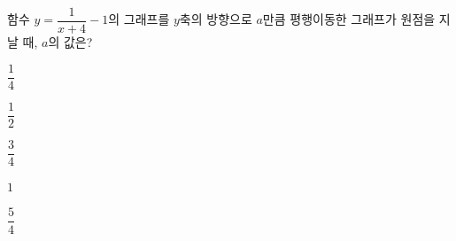 \hspace*{2mm}\begin{minipage}[t]{\dimexpr\linewidth-2mm\relax}\vspace{0pt}
함수 $y=\dfrac{1}{x+4}-1$의 그래프를 $y$축의 방향으로 $a$만큼 평행이동한 그래프가 원점을 지날 때, $a$의 값은?
\begin{choices32}{\rule[-3ex]{0pt}{8ex}$\dfrac{1}{4}$}{\rule[-3ex]{0pt}{8ex}$\dfrac{1}{2}$}{\rule[-3ex]{0pt}{8ex}$\dfrac{3}{4}$}{\rule[-3ex]{0pt}{8ex}$1$}{\rule[-3ex]{0pt}{8ex}$\dfrac{5}{4}$}\end{choices32}\end{minipage}
